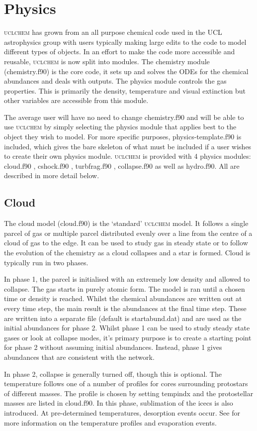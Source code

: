 \documentclass{llncs}
\begin{document}
\section{Physics}
\label{sec:physicsmods}
\textsc{uclchem} has grown from an all purpose chemical code used in the UCL astrophysics group with users typically making large edits to the code to model different types of objects. In an effort to make the code more accessible and reusable, \textsc{uclchem} is now split into modules. The chemistry module (chemistry.f90) is the core code, it sets up and solves the ODEs for the chemical abundances and deals with outputs. The physics module controls the gas properties. This is primarily the density, temperature and visual extinction but other variables are accessible from this module. \par
%
The average user will have no need to change chemistry.f90 and will be able to use \textsc{uclchem} by simply selecting the physics module that applies best to the object they wish to model. For more specific purposes, physics-template.f90 is included, which gives the bare skeleton of what must be included if a user wishes to create their own physics module. \textsc{uclchem} is provided with 4 physics modules: cloud.f90 \citep{viti2004}, cshock.f90 \citep{jimenez2008}, turbfrag.f90 \citep{Holdship2015}, collapse.f90 \citep{Priestley2018} as well as hydro.f90. All are described in more detail below.
%
\subsection{Cloud}
The cloud model (cloud.f90) is the `standard' \textsc{uclchem} model. It follows a single parcel of gas or multiple parcel distributed evenly over a line from the centre of a cloud of gas to the edge. It can be used to study gas in steady state or to follow the evolution of the chemistry as a cloud collapses and a star is formed. Cloud is typically run in two phases. \par
In phase 1, the parcel is initialised with an extremely low density and allowed to collapse. The gas starts in purely atomic form. The model is ran until a chosen time or density is reached. Whilst the chemical abundances are written out at every time step, the main result is the abundances at the final time step. These are written into a separate file (default is startabund.dat) and are used as the initial abundances for phase 2. Whilst phase 1 can be used to study steady state gases or look at collapse modes, it's primary purpose is to create a starting point for phase 2 without assuming initial abundances. Instead, phase 1 gives abundances that are consistent with the network.\par
In phase 2, collapse is generally turned off, though this is optional. The temperature follows one of a number of profiles for cores surrounding protostars of different masses. The profile is chosen by setting tempindx and the protostellar masses are listed in cloud.f90.  In this phase, sublimation of the icecs is also introduced. At pre-determined temperatures, desorption events occur. See \citet{viti2004} for more information on the temperature profiles and evaporation events.
%
\end{document}
